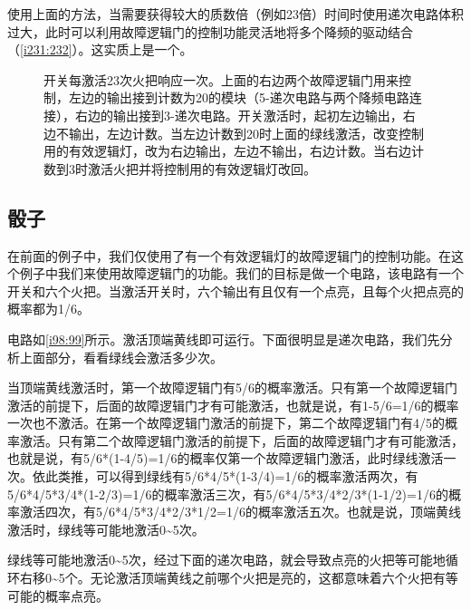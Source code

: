 使用上面的方法，当需要获得较大的质数倍（例如23倍）时间时使用递次电路体积过大，此时可以利用故障逻辑门的控制功能灵活地将多个降频的驱动结合（\autoref{i231:232}）。这实质上是一个\hyperref[sec5]{}。

\begin{figure}[!ht]
\centering
{}%
%
\caption{开关每激活23次火把响应一次。上面的右边两个故障逻辑门用来控制，左边的输出接到计数为20的模块（5-递次电路与两个降频电路连接），右边的输出接到3-递次电路。开关激活时，起初左边输出，右边不输出，左边计数。当左边计数到20时上面的绿线激活，改变控制用的有效逻辑灯，改为右边输出，左边不输出，右边计数。当右边计数到3时激活火把并将控制用的有效逻辑灯改回。}
\label{i231:232}
\end{figure}

\subsection{骰子}

在前面的例子中，我们仅使用了有一个有效逻辑灯的故障逻辑门的控制功能。在这个例子中我们来使用故障逻辑门的功能。我们的目标是做一个电路，该电路有一个开关和六个火把。当激活开关时，六个输出有且仅有一个点亮，且每个火把点亮的概率都为1/6。

电路如\autoref{i98:99}所示。激活顶端黄线即可运行。下面很明显是递次电路，我们先分析上面部分，看看绿线会激活多少次。

\begin{figure}[!ht]
\centering
{}%
%
\caption{}
\label{i98:99}
\end{figure}

当顶端黄线激活时，第一个故障逻辑门有5/6的概率激活。只有第一个故障逻辑门激活的前提下，后面的故障逻辑门才有可能激活，也就是说，有1-5/6=1/6的概率一次也不激活。在第一个故障逻辑门激活的前提下，第二个故障逻辑门有4/5的概率激活。只有第二个故障逻辑门激活的前提下，后面的故障逻辑门才有可能激活，也就是说，有5/6*(1-4/5)=1/6的概率仅第一个故障逻辑门激活，此时绿线激活一次。依此类推，可以得到绿线有5/6*4/5*(1-3/4)=1/6的概率激活两次，有5/6*4/5*3/4*(1-2/3)=1/6的概率激活三次，有5/6*4/5*3/4*2/3*(1-1/2)=1/6的概率激活四次，有5/6*4/5*3/4*2/3*1/2=1/6的概率激活五次。也就是说，顶端黄线激活时，绿线等可能地激活0\~{}5次。

绿线等可能地激活0\~{}5次，经过下面的递次电路，就会导致点亮的火把等可能地循环右移0\~{}5个。无论激活顶端黄线之前哪个火把是亮的，这都意味着六个火把有等可能的概率点亮。

